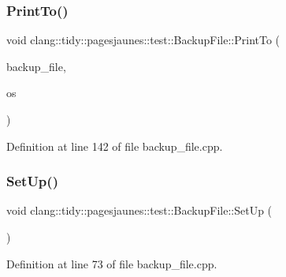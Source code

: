 \subsubsection{\texorpdfstring{Print\+To()}{PrintTo()}}
{\footnotesize\ttfamily void clang\+::tidy\+::pagesjaunes\+::test\+::\+Backup\+File\+::\+Print\+To (\begin{DoxyParamCaption}\item[{const \hyperlink{classclang_1_1tidy_1_1pagesjaunes_1_1test_1_1_backup_file}{Backup\+File} \&}]{backup\+\_\+file,  }\item[{\+::std\+::ostream $\ast$}]{os }\end{DoxyParamCaption})}



Definition at line 142 of file backup\+\_\+file.\+cpp.

\mbox{\label{classclang_1_1tidy_1_1pagesjaunes_1_1test_1_1_backup_file_aad0e95d0c9bad2e2104fb6cb8ec7cacc}} 
\subsubsection{\texorpdfstring{Set\+Up()}{SetUp()}}
{\footnotesize\ttfamily void clang\+::tidy\+::pagesjaunes\+::test\+::\+Backup\+File\+::\+Set\+Up (\begin{DoxyParamCaption}\item[{void}]{ }\end{DoxyParamCaption})\hspace{0.3cm}{\ttfamily [virtual]}}



Definition at line 73 of file backup\+\_\+file.\+cpp.

